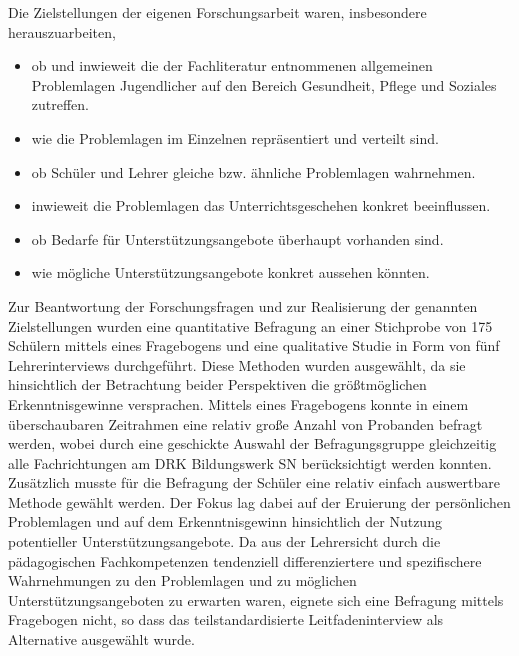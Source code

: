 \noindent
Die Zielstellungen der eigenen Forschungsarbeit waren, insbesondere herauszuarbeiten, 
\begin{itemize}
	\item ob und inwieweit die der Fachliteratur entnommenen allgemeinen Problemlagen Jugendlicher auf den Bereich Gesundheit, Pflege und Soziales zutreffen.
	\item wie die Problemlagen im Einzelnen repräsentiert und verteilt sind.
	\item ob Schüler und Lehrer gleiche bzw. ähnliche Problemlagen wahrnehmen.
	\item inwieweit die Problemlagen das Unterrichtsgeschehen konkret beeinflussen.
	\item ob Bedarfe für  Unterstützungsangebote überhaupt vorhanden sind.
	\item wie mögliche Unterstützungsangebote konkret aussehen könnten. 
\end{itemize}

\noindent
Zur Beantwortung der Forschungsfragen und zur Realisierung der genannten Zielstellungen wurden eine quantitative Befragung an einer Stichprobe von 175 Schülern mittels eines Fragebogens und eine qualitative Studie in Form von fünf Lehrerinterviews durchgeführt. Diese Methoden wurden ausgewählt, da sie hinsichtlich der Betrachtung beider Perspektiven die größtmöglichen Erkenntnisgewinne versprachen. Mittels eines Fragebogens konnte in einem überschaubaren Zeitrahmen eine relativ große Anzahl von Probanden befragt werden, wobei durch eine geschickte Auswahl der Befragungsgruppe gleichzeitig alle Fachrichtungen am DRK Bildungswerk SN berücksichtigt werden konnten. Zusätzlich musste für die Befragung der Schüler eine relativ einfach auswertbare Methode gewählt werden. Der Fokus lag dabei auf der Eruierung der persönlichen Problemlagen und auf dem Erkenntnisgewinn hinsichtlich der Nutzung potentieller Unterstützungsangebote. Da aus der Lehrersicht durch die pädagogischen Fachkompetenzen tendenziell differenziertere und spezifischere Wahrnehmungen zu den Problemlagen und zu möglichen Unterstützungsangeboten zu erwarten waren, eignete sich eine Befragung mittels Fragebogen nicht, so dass das teilstandardisierte Leitfadeninterview als Alternative ausgewählt wurde. 

